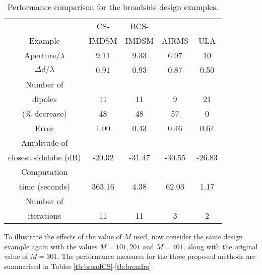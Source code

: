 \documentclass[10pt,final]{IEEEtran}
\begin{document}
\begin{table}
\caption{\rm Performance comparison for the broadside design examples.} \centering
\begin{tabular}{|c|c|c|c|c|}
  \hline
   & CS- & BCS- &  &\\
  Example & IMDSM & IMDSM & AIRMS &ULA\\
  \hline
  Aperture/$\lambda$ & 9.11 & 9.33 & 6.97 &10\\
  $\overline{\Delta{d}}/\lambda$ & 0.91 & 0.93 & 0.87& 0.50\\
  \hline
  Number of &  &  & & \\
  dipoles & 11 & 11 & 9&21 \\
  ($\%$ decrease) & 48  & 48 &57 &0 \\
  \hline
  Error & 1.00 & 0.43 & 0.46 &0.64\\
  \hline
  Amplitude of &  &  &  &\\
  closest sidelobe (dB)& -20.02 & -31.47 & -30.55&-26.83 \\
  \hline
  Computation &  &  &  &\\
  time (seconds) & 363.16 & 4.38 & 62.03 &1.17\\
  \hline
  Number of &  &  &  &\\
  iterations & 11 & 11 & 3 &2\\
  \hline
\end{tabular}
\label{tb:linearbroadcompare}
\end{table}

To illustrate the effects of the value of $M$ used, now consider the same design example again with the values $M=101,201$ and $M=401$, along with the original value of $M=301$.  The performance measures for the three proposed methods are summarised in Tables \ref{tb:broadCS}-\ref{tb:broadre}.
\end{document}
